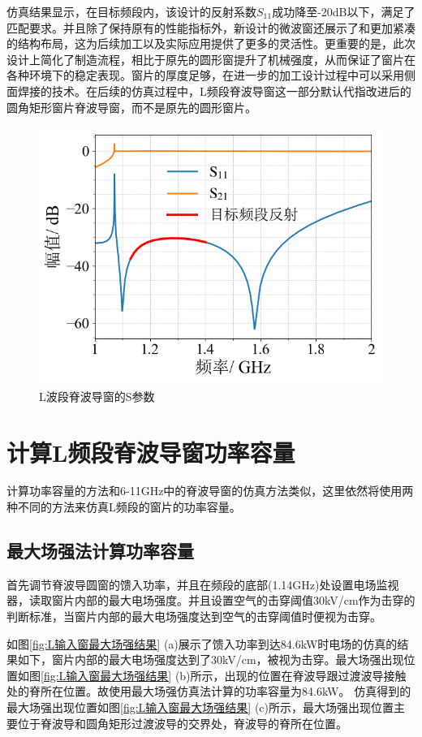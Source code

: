 \documentclass[master]{thesis-uestc}
\begin{document}
仿真结果显示，在目标频段内，该设计的反射系数$S_{11}$成功降至-20dB以下，满足了匹配要求。并且除了保持原有的性能指标外，新设计的微波窗还展示了和更加紧凑的结构布局，这为后续加工以及实际应用提供了更多的灵活性。更重要的是，此次设计上简化了制造流程，相比于原先的圆形窗提升了机械强度，从而保证了窗片在各种环境下的稳定表现。窗片的厚度足够，在进一步的加工设计过程中可以采用侧面焊接的技术。在后续的仿真过程中，L频段脊波导窗这一部分默认代指改进后的圆角矩形窗片脊波导窗，而不是原先的圆形窗片。

\begin{figure}[!htb]
    \centering
    \includegraphics[width=0.45\linewidth]{pic/chapter4/L波段脊波导窗S参数.png}
    \caption{L波段脊波导窗的S参数}
    \label{fig:L波段脊波导窗的S参数}
\end{figure}

\section{计算L频段脊波导窗功率容量}
计算功率容量的方法和6-11GHz中的脊波导窗的仿真方法类似，这里依然将使用两种不同的方法来仿真L频段的窗片的功率容量。

\subsection{最大场强法计算功率容量}
首先调节脊波导圆窗的馈入功率，并且在频段的底部(1.14GHz)处设置电场监视器，读取窗片内部的最大电场强度。并且设置空气的击穿阈值30kV/cm作为击穿的判断标准，当窗片内部的最大电场强度达到空气的击穿阈值时便视为击穿。

如图\ref{fig:L输入窗最大场强结果} (a)展示了馈入功率到达84.6kW时电场的仿真的结果如下，窗片内部的最大电场强度达到了30kV/cm，被视为击穿。最大场强出现位置如图\ref{fig:L输入窗最大场强结果} (b)所示，出现的位置在脊波导跟过渡波导接触处的脊所在位置。故使用最大场强仿真法计算的功率容量为84.6kW。
仿真得到的最大场强出现位置如图\ref{fig:L输入窗最大场强结果} (c)所示，最大场强出现位置主要位于脊波导和圆角矩形过渡波导的交界处，脊波导的脊所在位置。
\end{document}
